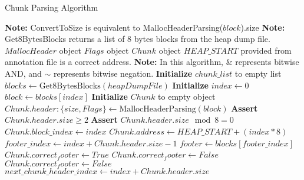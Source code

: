     \begin{algorithm}[H]
        \caption{Chunk Parsing Algorithm}
        \begin{algorithmic}[1]
            \State \textbf{Note:} ConvertToSize is equivalent to MallocHeaderParsing($block$).size
            \State \textbf{Note:} Get8BytesBlocks returns a list of 8 bytes blocks from the heap dump file.
            \Ensure $MallocHeader$ object
            \Ensure $Flags$ object
            \Ensure $Chunk$ object
            \Ensure $HEAP\_START$ provided from annotation file is a correct address.
            \State \textbf{Note:} In this algorithm, $\&$ represents bitwise AND, and $\sim$ represents bitwise negation.
            \State \textbf{Initialize} $chunk\_list$ to empty list
            \State $blocks \gets \text{Get8BytesBlocks}(heapDumpFile)$
            \State \textbf{Initialize} $index \gets 0$
                \State $block \gets blocks[index]$
                \State \textbf{Initialize} $Chunk$ to empty object
                    \State $Chunk.header : \{size, Flags\} \gets \text{MallocHeaderParsing}(block)$ 
                    \State \textbf{Assert} $Chunk.header.size \geq 2 $ 
                    \State \textbf{Assert} $Chunk.header.size \mod 8 = 0$ 
                    \State $Chunk.block\_index \gets index$ 
                    \State $Chunk.address \gets HEAP\_START + (index * 8)$ 
                    \State $footer\_index \gets index + Chunk.header.size - 1$ 
                        \State $footer \gets blocks[footer\_index]$
                            \State $Chunk.correct_footer \gets True$
                        \Else
                            \State $Chunk.correct_footer \gets False$
                        \EndIf
                    \Else
                        \State $Chunk.correct_footer \gets False$
                    \EndIf
                    \State $next\_chunk\_header\_index \gets index + Chunk.header.size$ 

\end{algorithmic}
\end{algorithm}
